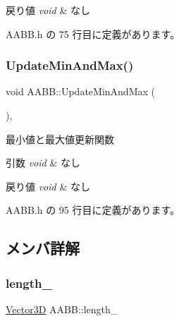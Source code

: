 \begin{DoxyRetVals}{戻り値}
{\em void} & なし \\
\hline
\end{DoxyRetVals}


 A\+A\+B\+B.\+h の 75 行目に定義があります。

\mbox{\label{class_a_a_b_b_aad10f509f6726aed8285063a69df9085}} 
\subsubsection{\texorpdfstring{Update\+Min\+And\+Max()}{UpdateMinAndMax()}}
{\footnotesize\ttfamily void A\+A\+B\+B\+::\+Update\+Min\+And\+Max (\begin{DoxyParamCaption}{ }\end{DoxyParamCaption})\hspace{0.3cm}{\ttfamily [inline]}, {\ttfamily [private]}}



最小値と最大値更新関数 


\begin{DoxyParams}{引数}
{\em void} & なし \\
\hline
\end{DoxyParams}

\begin{DoxyRetVals}{戻り値}
{\em void} & なし \\
\hline
\end{DoxyRetVals}


 A\+A\+B\+B.\+h の 95 行目に定義があります。



\subsection{メンバ詳解}
\mbox{\label{class_a_a_b_b_abade307dbbfa9c74638fde5387d629f8}} 
\subsubsection{\texorpdfstring{length\+\_\+}{length\_}}
{\footnotesize\ttfamily \mbox{\hyperlink{class_vector3_d}{Vector3D}} A\+A\+B\+B\+::length\+\_\+\hspace{0.3cm}{\ttfamily [private]}}



